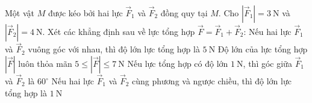 \begin{ex}%
	Một vật $M$ được kéo bởi hai lực $\overrightarrow{F}_1$ và $\overrightarrow{F}_2$ đồng quy tại $M$. Cho $\left|\overrightarrow{F}_1\right| = 3\ \text{N}$ và $\left|\overrightarrow{F}_2\right| = 4\ \text{N}$. Xét các khẳng định sau về lực tổng hợp $\overrightarrow{F} = \overrightarrow{F}_1 + \overrightarrow{F}_2$:
	\choiceTF
	{\True Nếu hai lực $\overrightarrow{F}_1$ và $\overrightarrow{F}_2$ vuông góc với nhau, thì độ lớn lực tổng hợp là $5\ \text{N}$}
	{Độ lớn của lực tổng hợp $\left|\overrightarrow{F}\right|$ luôn thỏa mãn $5 \le \left|\overrightarrow{F}\right| \le 7\ \text{N}$}
	{Nếu lực tổng hợp có độ lớn $1\ \text{N}$, thì góc giữa $\overrightarrow{F}_1$ và $\overrightarrow{F}_2$ là $60^\circ$}
	{\True  Nếu hai lực $\overrightarrow{F}_1$ và $\overrightarrow{F}_2$ cùng phương và ngược chiều, thì độ lớn lực tổng hợp là $1\ \text{N}$}
\end{ex}
